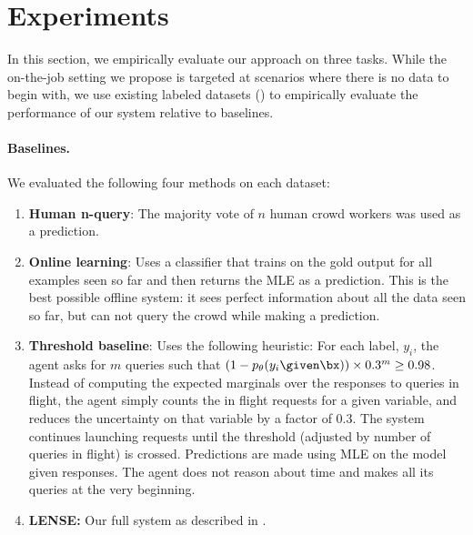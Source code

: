 \section{Experiments}
\label{sec:experiments}


In this section, we empirically evaluate our approach on three tasks. 
While the on-the-job setting we propose is targeted at scenarios where there is no data to begin with, we use existing labeled datasets () to empirically evaluate the performance of our system relative to baselines.

\paragraph{Baselines.}
We evaluated the following four methods on each dataset:
\begin{enumerate}
  \item {\bf Human n-query}: The majority vote of $n$ human crowd workers was used as a prediction.
  \item {\bf Online learning}:
    Uses a classifier that trains on the gold output for all examples seen so far and then returns the MLE as a prediction.
    This is the best possible offline system: it sees perfect information about all the data seen so far, but can not query the crowd while making a prediction.
  \item {\bf Threshold baseline}: Uses the following heuristic:
    For each label, $y_i$, the agent asks for $m$ queries such that $(1 - \p(y_i\given \bx))\times 0.3^m \ge 0.98$. %
    Instead of computing the expected marginals over the responses to queries in flight, the agent simply counts the in flight requests for a given variable, and reduces the uncertainty on that variable by a factor of $0.3$. The system continues launching requests until the threshold (adjusted by number of queries in flight) is crossed. Predictions are made using MLE on the model given responses.
    The agent does not reason about time and makes all its queries at the very beginning.
  \item {\bf LENSE:} Our full system as described in .
\end{enumerate}


